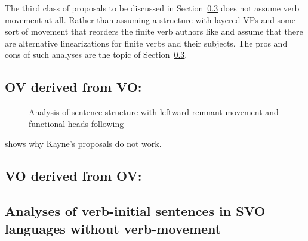 The third class of proposals to be discussed in Section~\ref{sec-aux-flat} does not assume verb movement at
all. Rather than assuming a structure with layered VPs and some sort of movement that reorders the
finite verb authors like \citet*{GKPS85a} and \citet{Sag2020a} assume that there are alternative
linearizations for finite verbs and their subjects. The pros and cons of such analyses are the topic
of Section~\ref{sec-aux-flat}.

\subsection{OV derived from VO: \citet{Kayne94a-u}}

\citet{Kayne94a-u} 


\begin{figure}
\caption{\label{Abbildung-Remnant-Movement-Satzstruktur}Analysis of sentence structure with leftward remnant movement
  and functional heads following \citet[]{Laenzlinger2004a}}
\end{figure}%

\citet{Haider2000a} shows why Kayne's proposals do not work.

\subsection{VO derived from OV: \citet{Haider2020a}}

\citet{Haider2000a,Haider2020a}

\subsection{Analyses of verb-initial sentences in SVO languages without verb-movement}
\label{sec-aux-flat}

